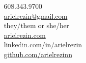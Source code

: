 \documentclass[]{hieudo-build}
\begin{document}
%
%
{
	\faPhone \hspace{3pt} {608.343.9700}\\
	\faEnvelope \hspace{3pt} \href{mailto:arielrezin@gmail.com}{arielrezin@gmail.com}\\
	\hspace{1pt} \faTransgender \hspace{3pt} {they/them or she/her}\\
}
{
	\faGlobe \hspace{2.25pt} \href{https://arielrezin.com}{arielrezin.com}\\
	\faLinkedin \hspace{3pt} \href{https://linkedin.com/in/arielrezin}{linkedin.com/in/arielrezin}\\
	\faGithub \hspace{2pt} \href{https://github.com/arielrezinn}{github.com/arielrezinn}\\
}
\end{document}
